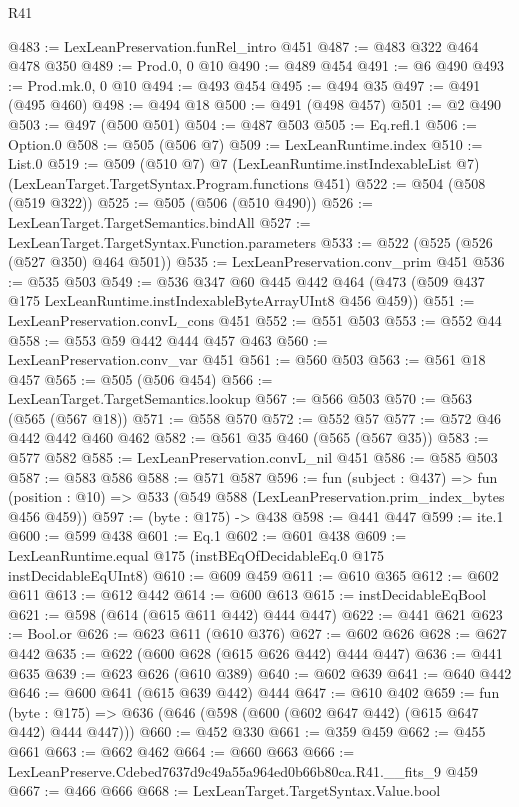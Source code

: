 \begin{lexlean}{R41}
\begin{coremodule}
@483 := LexLeanPreservation.funRel_intro @451
@487 := @483 @322 @464 @478 @350
@489 := Prod.{0, 0} @10
@490 := @489 @454
@491 := @6 @490
@493 := Prod.mk.{0, 0} @10
@494 := @493 @454
@495 := @494 @35
@497 := @491 (@495 @460)
@498 := @494 @18
@500 := @491 (@498 @457)
@501 := @2 @490
@503 := @497 (@500 @501)
@504 := @487 @503
@505 := Eq.refl.{1}
@506 := Option.{0}
@508 := @505 (@506 @7)
@509 := LexLeanRuntime.index
@510 := List.{0}
@519 := @509
    (@510 @7)
    @7
    (LexLeanRuntime.instIndexableList @7)
    (LexLeanTarget.TargetSyntax.Program.functions @451)
@522 := @504 (@508 (@519 @322))
@525 := @505 (@506 (@510 @490))
@526 := LexLeanTarget.TargetSemantics.bindAll
@527 := LexLeanTarget.TargetSyntax.Function.parameters
@533 := @522 (@525 (@526 (@527 @350) @464 @501))
@535 := LexLeanPreservation.conv_prim @451
@536 := @535 @503
@549 := @536
    @347
    @60
    @445
    @442
    @464
    (@473 (@509 @437 @175 LexLeanRuntime.instIndexableByteArrayUInt8 @456 @459))
@551 := LexLeanPreservation.convL_cons @451
@552 := @551 @503
@553 := @552 @44
@558 := @553 @59 @442 @444 @457 @463
@560 := LexLeanPreservation.conv_var @451
@561 := @560 @503
@563 := @561 @18 @457
@565 := @505 (@506 @454)
@566 := LexLeanTarget.TargetSemantics.lookup
@567 := @566 @503
@570 := @563 (@565 (@567 @18))
@571 := @558 @570
@572 := @552 @57
@577 := @572 @46 @442 @442 @460 @462
@582 := @561 @35 @460 (@565 (@567 @35))
@583 := @577 @582
@585 := LexLeanPreservation.convL_nil @451
@586 := @585 @503
@587 := @583 @586
@588 := @571 @587
@596 := fun (subject : @437) =>
  fun (position : @10) => @533 (@549 @588 (LexLeanPreservation.prim_index_bytes @456 @459))
@597 := (byte : @175) -> @438
@598 := @441 @447
@599 := ite.{1}
@600 := @599 @438
@601 := Eq.{1}
@602 := @601 @438
@609 := LexLeanRuntime.equal @175 (instBEqOfDecidableEq.{0} @175 instDecidableEqUInt8)
@610 := @609 @459
@611 := @610 @365
@612 := @602 @611
@613 := @612 @442
@614 := @600 @613
@615 := instDecidableEqBool
@621 := @598 (@614 (@615 @611 @442) @444 @447)
@622 := @441 @621
@623 := Bool.or
@626 := @623 @611 (@610 @376)
@627 := @602 @626
@628 := @627 @442
@635 := @622 (@600 @628 (@615 @626 @442) @444 @447)
@636 := @441 @635
@639 := @623 @626 (@610 @389)
@640 := @602 @639
@641 := @640 @442
@646 := @600 @641 (@615 @639 @442) @444
@647 := @610 @402
@659 := fun (byte : @175) => @636 (@646 (@598 (@600 (@602 @647 @442) (@615 @647 @442) @444 @447)))
@660 := @452 @330
@661 := @359 @459
@662 := @455 @661
@663 := @662 @462
@664 := @660 @663
@666 := LexLeanPreserve.Cdebed7637d9c49a55a964ed0b66b80ca.R41.__fits_9 @459
@667 := @466 @666
@668 := LexLeanTarget.TargetSyntax.Value.bool

\end{coremodule}
\end{lexlean}
